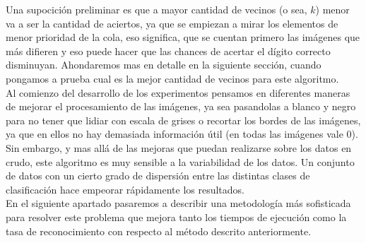 Una supocición preliminar es que a mayor cantidad de vecinos (o sea, $k$) menor va a ser la cantidad de aciertos, ya que se empiezan a mirar los elementos de menor prioridad de la cola, eso significa, que se cuentan primero las imágenes que más difieren y eso puede hacer que las chances de acertar el dígito correcto disminuyan. Ahondaremos mas en detalle en la siguiente sección, cuando pongamos a prueba cual es la mejor cantidad de vecinos para este algoritmo.
\\
Al comienzo del desarrollo de los experimentos pensamos en diferentes maneras de mejorar el procesamiento de las imágenes, ya sea pasandolas a blanco y negro para no tener que lidiar con escala de grises o recortar los bordes de las imágenes, ya que en ellos no hay demasiada información útil (en todas las imágenes vale 0).
\\
Sin embargo, y mas allá de las mejoras que puedan realizarse sobre los datos en crudo, este algoritmo es muy sensible a la variabilidad de los datos. Un conjunto de datos con un cierto grado de dispersión entre las distintas clases de clasificación hace empeorar rápidamente los resultados.
\\
En el siguiente apartado pasaremos a describir una metodología más sofisticada para resolver este problema que mejora tanto los tiempos de ejecución como la tasa de reconocimiento con respecto al método descrito anteriormente.

